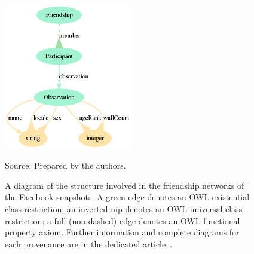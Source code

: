 	\begin{figure}[!ht]
		\centering
			    \caption{A diagram of the structure involved in the friendship networks
				of the Facebook snapshots.
				A green edge denotes an OWL existential class restriction;
				an inverted nip denotes an OWL universal class restriction;
				a full (non-dashed) edge denotes an OWL functional property axiom.
				Further information and complete diagrams for each provenance are in the dedicated article~\cite{losd}.}\label{dia}
			\includegraphics[width=0.5\textwidth]{ontologies/facebook-legacy-AntonioAnzoategui18022013Friendship.ttl/draw}
\begin{flushleft}
		Source: Prepared by the authors.\
\end{flushleft}
	\end{figure}



